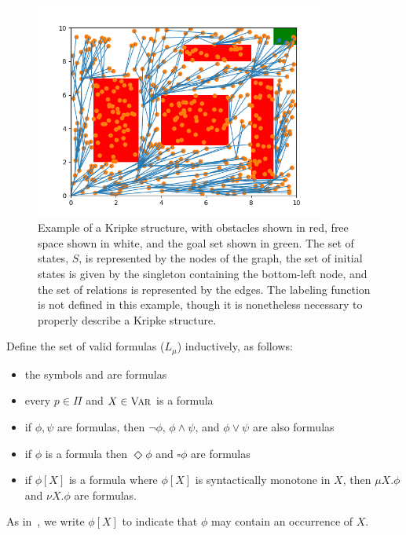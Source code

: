 \begin{figure}[ht]
    \begin{center}
        \includegraphics[width=0.85\textwidth]{./figures/kripke_example}
    \end{center}
    \caption[Example of a Kripke structure]{Example of a Kripke structure, with obstacles shown in red, free space shown in white, and the goal set shown in green. The set of states, $S$, is represented by the nodes of the graph, the set of initial states is given by the singleton containing the bottom-left node, and the set of relations is represented by the edges. The labeling function is not defined in this example, though it is nonetheless necessary to properly describe a Kripke structure.}
\label{fig:kripke}
\end{figure}


\noindent Define the set of valid \mucalc{} formulas ($L_\mu$) inductively, as follows:
\begin{itemize}
    \item the symbols \true{} and \false{} are formulas
    \item every $p \in \Pi$ and $X \in \textsc{Var}$ is a formula
    \item if $\phi,\psi$ are formulas, then $\lnot \phi$, $\phi \land \psi$, and $\phi \lor \psi$ are also formulas
    \item if $\phi$ is a formula then $\Diamond \phi$ and $\square \phi$ are formulas
    \item if $\phi[X]$ is a formula where $\phi[X]$ is syntactically monotone in $X$, then $\mu X.\phi$ and $\nu X.\phi$ are formulas.
\end{itemize}
As in~\cite{Gurfinkel2004}, we write $\phi[X]$ to indicate that $\phi$ may contain an occurrence of $X$.


